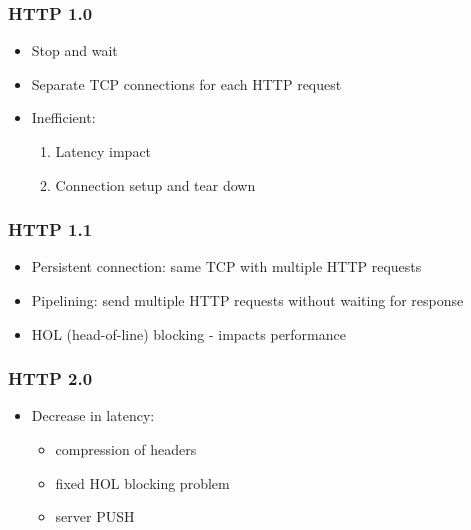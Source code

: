 \documentclass[11pt]{article}
\begin{document}
\subsubsection{HTTP 1.0}
\label{sec:orgheadline148}
\begin{itemize}
\item Stop and wait
\item Separate TCP connections for each HTTP request
\item Inefficient:
\begin{enumerate}
\item Latency impact
\item Connection setup and tear down
\end{enumerate}
\end{itemize}

\subsubsection{HTTP 1.1}
\label{sec:orgheadline149}
\begin{itemize}
\item Persistent connection: same TCP with multiple HTTP requests
\item Pipelining: send multiple HTTP requests without waiting for response
\item HOL (head-of-line) blocking - impacts performance
\end{itemize}

\subsubsection{HTTP 2.0}
\label{sec:orgheadline150}
\begin{itemize}
\item Decrease in latency:
\begin{itemize}
\item compression of headers
\item fixed HOL blocking problem
\item server PUSH
\end{itemize}
\end{itemize}
\end{document}
